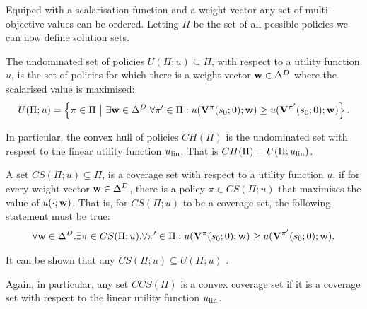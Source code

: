     Equiped with a scalarisation function and a weight vector any set of multi-objective values can be ordered. Letting $\Pi$ be the set of all possible policies we can now define solution sets.

    \begin{defn}
        \label{def:undominated_set}
        \label{def:convex_hull}
        The \textnormal{undominated set} of policies $U(\Pi;u)\subseteq\Pi$, with respect to a utility function $u$,  is the set of policies for which there is a weight vector $\mathbf{w}\in\Delta^D$ where the scalarised value is maximised: 
        \begin{align}
            U(\Pi;u) = \left\{\pi\in\Pi\ \big|\ \exists \mathbf{w}\in\Delta^D. \forall \pi'\in\Pi: u(\mathbf{V}^{\pi}(s_0;0);\mathbf{w}) \geq u(\mathbf{V}^{\pi'}(s_0;0);\mathbf{w}) \right\}.
        \end{align}

        In particular, the \textnormal{convex hull} of policies $CH(\Pi)$ is the undominated set with respect to the linear utility function $u_{{\textnormal{lin}}}$. That is $CH(\Pi)=U(\Pi;u_{{\textnormal{lin}}})$.
    \end{defn}    



    \begin{defn}
        \label{def:coverage_set}
        \label{def:convex_coverage_set}
        A set $CS(\Pi;u)\subseteq\Pi$, is a \textnormal{coverage set} with respect to a utility function $u$, if for every weight vector $\mathbf{w}\in\Delta^D$, there is a policy $\pi\in CS(\Pi;u)$ that maximises the value of $u(\cdot;\mathbf{w})$. That is, for $CS(\Pi;u)$ to be a coverage set, the following statement must be true:
        \begin{align}
            \forall \mathbf{w}\in\Delta^D. \exists \pi\in CS(\Pi;u). \forall \pi'\in\Pi: u(\mathbf{V}^{\pi}(s_0;0);\mathbf{w}) \geq u(\mathbf{V}^{\pi'}(s_0;0);\mathbf{w}).
        \end{align}

        It can be shown that any $CS(\Pi;u)\subseteq U(\Pi;u)$ .

        Again, in particular, any set $CCS(\Pi)$ is a \textnormal{convex coverage set} if it is a coverage set with respect to the linear utility function $u_{{\textnormal{lin}}}$. 
    \end{defn}


